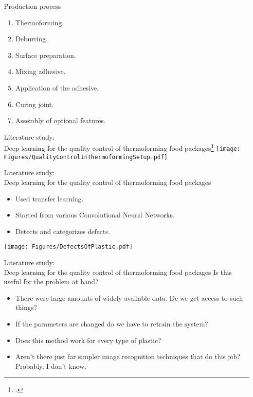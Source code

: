 \documentclass{beamer}
\begin{document}
	\begin{frame}{Production process}
		\begin{enumerate}
			\item Thermoforming.
			\item Deburring.
			\item Surface preparation.
			\item Mixing adhesive.
			\item Application of the adhesive.
			\item Curing joint.
			\item Assembly of optional features.
		\end{enumerate}
	\end{frame}
	
	\begin{frame}{Literature study:\\Deep learning for the quality control of thermoforming food packages\footcite{Banus2021}}
		\centering
		\texttt{[image: Figures/QualityControlInThermoformingSetup.pdf]}
	\end{frame}

	\begin{frame}{Literature study:\\Deep learning for the quality control of thermoforming food packages}
		\begin{itemize}
			\item Used transfer learning.
			\item Started from various Convolutional Neural Networks.
			\item Detects and categorizes defects.
		\end{itemize}
		\centering
		\texttt{[image: Figures/DefectsOfPlastic.pdf]}
	\end{frame}
	
	\begin{frame}{Literature study:\\Deep learning for the quality control of thermoforming food packages}
		Is this useful for the problem at hand?
		\pause
		\begin{itemize}
			\item There were large amounts of widely available data. De we get access to such things?
			\pause
			\item If the parameters are changed do we have to retrain the system?
			\pause
			\item Does this method work for every type of plastic?
			\pause
			\item Aren't there just far simpler image recognition techniques that do this job? Probably, I don't know.
		\end{itemize}
	\end{frame}
\end{document}
